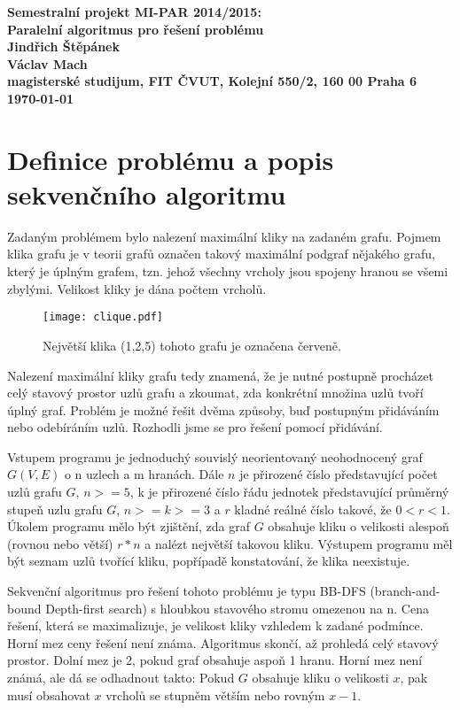 \documentclass[12pt]{article}
\begin{document}
\begin{center}
  \bf Semestralní projekt MI-PAR 2014/2015:\\[5mm]
      Paralelní algoritmus pro řešení problému\\[5mm]
         Jindřich Štěpánek\\
         Václav Mach\\[2mm]
  magisterské studijum, FIT ČVUT, Kolejní 550/2, 160 00 Praha 6\\[2mm]
  \today
\end{center}

\section{Definice problému a popis sekvenčního algoritmu}

Zadaným problémem bylo nalezení maximální kliky na zadaném grafu.
Pojmem klika grafu je v teorii grafů označen takový maximální podgraf nějakého grafu, 
který je úplným grafem, tzn. jehož všechny vrcholy jsou spojeny hranou se všemi zbylými.
Velikost kliky je dána počtem vrcholů.

\begin{figure}[ht]
  \begin{center}
    \texttt{[image: clique.pdf]}
  \end{center}
  \caption{Největší klika (1,2,5) tohoto grafu je označena červeně.}
\end{figure}

Nalezení maximální kliky grafu tedy znamená, že je nutné postupně procházet celý stavový prostor uzlů grafu
a zkoumat, zda konkrétní množina uzlů tvoří úplný graf. Problém je možné řešit dvěma způsoby, 
buď postupným přidáváním nebo odebíráním uzlů. Rozhodli jsme se pro řešení pomocí přidávání.

Vstupem programu je jednoduchý souvislý neorientovaný neohodnocený graf $G(V, E)$ o n uzlech a m hranách. 
Dále $n$ je přirozené číslo představující počet uzlů grafu $G$, $n >= 5$,
k je přirozené číslo řádu jednotek představující průměrný stupeň uzlu grafu $G$, $n >= k >= 3$ a $r$ kladné reálné číslo takové, že $0 < r < 1$.
Úkolem programu mělo být zjištění, zda graf $G$ obsahuje kliku o velikosti alespoň (rovnou nebo větší) $r * n$ a nalézt největší takovou kliku. 
Výstupem programu měl být seznam uzlů tvořící kliku, popřípadě konstatování, že klika neexistuje. 

Sekvenční algoritmus pro řešení tohoto problému je typu BB-DFS (branch-and-bound Depth-first search) 
s hloubkou stavového stromu omezenou na n. 
Cena řešení, která se maximalizuje, je velikost kliky vzhledem k zadané podmínce. 
Horní mez ceny řešení není známa. Algoritmus skončí, až prohledá celý stavový prostor.
Dolní mez je 2, pokud graf obsahuje aspoň 1 hranu.
Horní mez není známá, ale dá se odhadnout takto: Pokud $G$ obsahuje kliku o velikosti $x$, pak musí obsahovat $x$ vrcholů se stupněm větším nebo rovným $x-1$.
\end{document}
